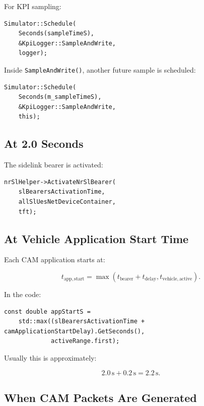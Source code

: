 \documentclass[11pt,a4paper]{article}
\begin{document}
For KPI sampling:

\begin{lstlisting}[style=cppstyle]
Simulator::Schedule(
    Seconds(sampleTimeS),
    &KpiLogger::SampleAndWrite,
    logger);
\end{lstlisting}

Inside \texttt{SampleAndWrite()}, another future sample is scheduled:

\begin{lstlisting}[style=cppstyle]
Simulator::Schedule(
    Seconds(m_sampleTimeS),
    &KpiLogger::SampleAndWrite,
    this);
\end{lstlisting}

\subsection{At 2.0 Seconds}

The sidelink bearer is activated:

\begin{lstlisting}[style=cppstyle]
nrSlHelper->ActivateNrSlBearer(
    slBearersActivationTime,
    allSlUesNetDeviceContainer,
    tft);
\end{lstlisting}

\subsection{At Vehicle Application Start Time}

Each CAM application starts at:

\begin{equation}
t_{\mathrm{app,start}} =
\max(t_{\mathrm{bearer}} + t_{\mathrm{delay}}, t_{\mathrm{vehicle,active}}).
\end{equation}

In the code:

\begin{lstlisting}[style=cppstyle]
const double appStartS =
    std::max((slBearersActivationTime + camApplicationStartDelay).GetSeconds(),
             activeRange.first);
\end{lstlisting}

Usually this is approximately:

\begin{equation}
2.0\,\mathrm{s} + 0.2\,\mathrm{s} = 2.2\,\mathrm{s}.
\end{equation}

\subsection{When CAM Packets Are Generated}
\end{document}
